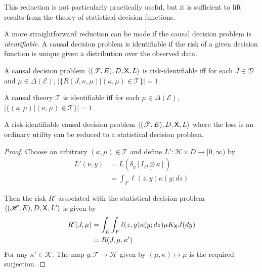 This reduction is not particularly practically useful, but it is sufficient to lift results from the theory of statistical decision functions.

\begin{theorem}

\end{theorem}

A more straightforward reduction can be made if the causal decision problem is \emph{identifiable}. A causal decision problem is identifiable if the risk of a given decision function is unique given a distribution over the observed data.

\begin{definition}[Identifiability]
A causal decision problem $\langle (\mathscr{T}, E), D, \mathsf{X}, L \rangle$ is risk-identifiable iff for each $J\in \mathscr{D}$ and $\mu\in \Delta(\mathcal{E})$, $|\{R(J,\kappa,\mu)|(\kappa,\mu)\in \mathscr{T}\}|=1$.

A causal theory $\mathscr{T}$ is identifiable iff for each $\mu\in \Delta(\mathcal{E})$, $|\{(\kappa,\mu)|(\kappa,\mu)\in\mathscr{T}\}|=1$.
\end{definition}

\begin{theorem}
A risk-identifiable causal decision problem $\langle (\mathscr{T}, E), D, \mathsf{X}, L \rangle$ where the loss is an ordinary utility can be reduced to a statistical decision problem.
\end{theorem}

\begin{proof}


Choose an arbitrary $(\kappa,\mu)\in\mathscr{T}$ and define $L':\mathscr{H}\times D\to [0,\infty)$ by
\begin{align}
    L'(\nu,y) &= L(\delta_y\underline{[I_D\otimes \kappa]})\\
              &= \int_F \ell(z,y) \kappa(y;dz)
\end{align}

Then the risk $R'$ associated with the statistical decision problem $\langle (\mathscr{H},E),D,\mathsf{X},L'\rangle$ is given by 
\begin{align}
    R'(J,\mu) &= \int_E \int_F \ell(z,y)  \kappa (y;dz) \mu K_{\mathsf{X}} J(dy)\\
              &= R(J,\mu,\kappa')
\end{align}
For any $\kappa'\in\mathscr{K}$. The map $g:\mathscr{T}\to\mathscr{H}$ given by $(\mu,\kappa)\mapsto \mu$ is the required surjection.
\end{proof}


